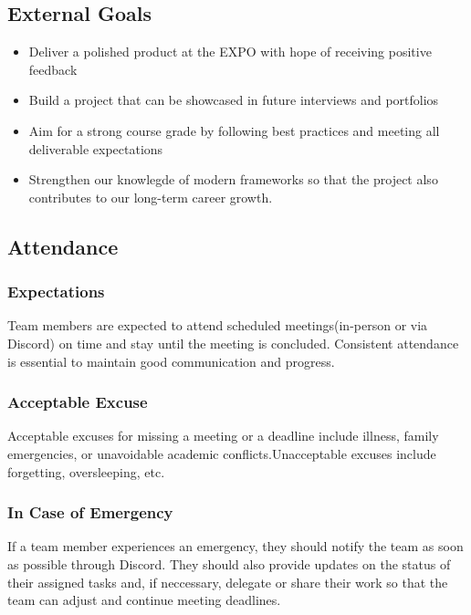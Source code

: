 \documentclass{article}
\begin{document}
\subsection*{External Goals}

\begin{itemize}
	\item Deliver a polished product at the EXPO with hope of receiving positive feedback
	\item Build a project that can be showcased in future interviews and portfolios
	\item Aim for a strong course grade by following best practices and meeting all deliverable expectations
	\item Strengthen our knowlegde of modern frameworks so that the project also contributes to our long-term career growth.
\end{itemize}

\subsection*{Attendance}

\subsubsection*{Expectations}

Team members are expected to attend scheduled meetings(in-person or via Discord) on time and stay until the meeting is concluded.  Consistent attendance is essential to maintain good communication and progress.

\subsubsection*{Acceptable Excuse}

Acceptable excuses for missing a meeting or a deadline include illness, family emergencies, or unavoidable academic conflicts.Unacceptable excuses include forgetting, oversleeping, etc.

\subsubsection*{In Case of Emergency}

If a team member experiences an emergency, they should notify the team as soon as possible through Discord. They should also provide updates on the status of their assigned tasks and, if neccessary, delegate or share their work so that the team can adjust and continue meeting deadlines.
\end{document}
